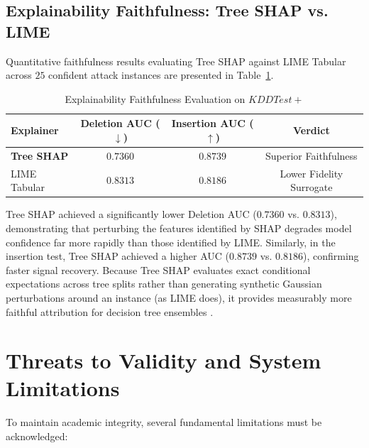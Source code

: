 \documentclass[conference]{IEEEtran}
\begin{document}
\subsection{Explainability Faithfulness: Tree SHAP vs. LIME}

Quantitative faithfulness results evaluating Tree SHAP against LIME Tabular across $25$ confident attack instances are presented in Table~\ref{tab:xai_results}.

\begin{table}[h]
\caption{Explainability Faithfulness Evaluation on $KDDTest+$}
\label{tab:xai_results}
\centering
\begin{tabular}{lccc}
\toprule
\textbf{Explainer} & \textbf{Deletion AUC ($\downarrow$)} & \textbf{Insertion AUC ($\uparrow$)} & \textbf{Verdict} \\
\midrule
\textbf{Tree SHAP} & $\mathbf{0.7360}$ & $\mathbf{0.8739}$ & Superior Faithfulness \\
LIME Tabular & $0.8313$ & $0.8186$ & Lower Fidelity Surrogate \\
\bottomrule
\end{tabular}
\end{table}

Tree SHAP achieved a significantly lower Deletion AUC ($0.7360$ vs. $0.8313$), demonstrating that perturbing the features identified by SHAP degrades model confidence far more rapidly than those identified by LIME. Similarly, in the insertion test, Tree SHAP achieved a higher AUC ($0.8739$ vs. $0.8186$), confirming faster signal recovery. Because Tree SHAP evaluates exact conditional expectations across tree splits rather than generating synthetic Gaussian perturbations around an instance (as LIME does), it provides measurably more faithful attribution for decision tree ensembles \cite{lundberg2020local}.

\section{Threats to Validity and System Limitations}

To maintain academic integrity, several fundamental limitations must be acknowledged:
\end{document}
